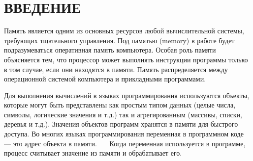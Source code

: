 \part*{ВВЕДЕНИЕ}

%
%
%
%
%



Память является одним из основных ресурсов любой вычислительной системы, требующих тщательного управления. Под памятью (memory) в работе будет подразумеваться оперативная память компьютера. Особая роль памяти объясняется тем, что процессор может выполнять инструкции программы только в том случае, если они находятся в памяти. Память распределяется между операционной системой компьютера и прикладными программами.~\cite{tannenbaum}

Для выполнения вычислений в языках программирования используются объекты, которые могут быть представлены как простым типом данных (целые числа, символы, логические значения и т.д.) так и агрегированным (массивы, списки, деревья и т.д.). Значения объектов программ хранятся в памяти для быстрого доступа. Во многих языках программирования переменная в программном коде --- это адрес объекта в памяти.~\cite{c}~\cite{cpp}~\cite{golang} Когда переменная используется в программе, процесс считывает значение из памяти и обрабатывает его.

